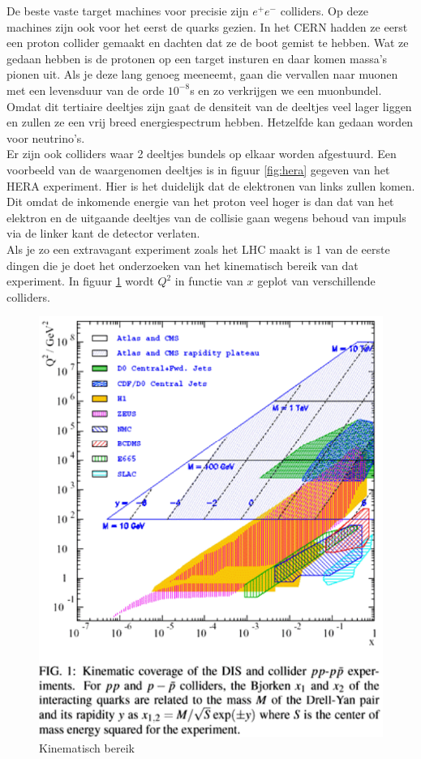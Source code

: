 \documentclass[../main.tex]{subfiles}
\begin{document}
De beste vaste target machines voor precisie zijn $e^+e^-$ colliders. Op deze machines zijn ook voor het eerst de quarks gezien. In het CERN hadden ze eerst een proton collider gemaakt en dachten dat ze de boot gemist te hebben. Wat ze gedaan hebben is de protonen op een target insturen en daar komen massa's pionen uit. Als je deze lang genoeg meeneemt, gaan die vervallen naar muonen met een levensduur van de orde $10^{-8}$s en zo verkrijgen we een muonbundel. Omdat dit tertiaire deeltjes zijn gaat de densiteit van de deeltjes veel lager liggen en zullen ze een vrij breed energiespectrum hebben. Hetzelfde kan gedaan worden voor neutrino's.\\
Er zijn ook colliders waar 2 deeltjes bundels op elkaar worden afgestuurd. Een voorbeeld van de waargenomen deeltjes is in figuur \ref{fig:hera} gegeven van het HERA experiment. Hier is het duidelijk dat de elektronen van links zullen komen. Dit omdat de inkomende energie van het proton veel hoger is dan dat van het elektron en de uitgaande deeltjes van de collisie gaan wegens behoud van impuls via de linker kant de detector verlaten.\\
Als je zo een extravagant experiment zoals het LHC maakt is 1 van de eerste dingen die je doet het onderzoeken van het kinematisch bereik van dat experiment. In figuur \ref{fig:kin_bereik} wordt $Q^2$ in functie van $x$ geplot van verschillende colliders.

\begin{figure}[h]
    \centering
    \includegraphics[width=0.8\linewidth]{DIS_nucleon_structuur_pdf/kin_bereik.png}
    \caption{Kinematisch bereik}%
    \label{fig:kin_bereik}
\end{figure}
\end{document}
